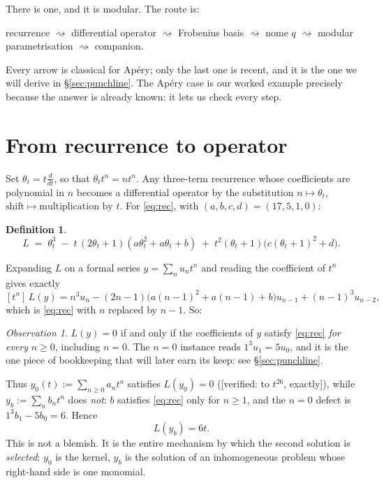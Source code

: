 \documentclass[11pt,reqno]{amsart}
\theoremstyle{plain}
\theoremstyle{definition}
\newtheorem{definition}[theorem]{Definition}
\theoremstyle{remark}
\newtheorem{observation}[theorem]{Observation}
\newcommand{\Ver}[1]{\textup{\textsf{[verified: #1]}}}
\newcommand{\ta}{\theta_t}
\numberwithin{equation}{section}
\begin{document}
There is one, and it is modular. The route is:
\begin{center}
recurrence $\rightsquigarrow$ differential operator $\rightsquigarrow$
Frobenius basis $\rightsquigarrow$ nome $q$ $\rightsquigarrow$ modular
parametrisation $\rightsquigarrow$ companion.
\end{center}
Every arrow is classical for Ap\'ery; only the last one is recent, and it is
the one we will derive in \S\ref{sec:punchline}. The Ap\'ery case is our worked
example precisely because the answer is already known: it lets us check every
step.

\section{From recurrence to operator}\label{sec:op}

Set $\ta=t\frac{d}{dt}$, so that $\ta t^n=nt^n$. Any three-term recurrence
whose coefficients are polynomial in $n$ becomes a differential operator by the
substitution $n\mapsto\ta$, $\text{shift}\mapsto\text{multiplication by }t$.
For \eqref{eq:rec}, with $(a,b,c,d)=(17,5,1,0)$:

\begin{definition}\label{def:L}
\[
  L \;=\; \ta^{3}\;-\;t\,(2\ta+1)(a\ta^{2}+a\ta+b)
        \;+\;t^{2}(\ta+1)\bigl(c(\ta+1)^{2}+d\bigr).
\]
\end{definition}

Expanding $L$ on a formal series $y=\sum_n u_nt^n$ and reading the coefficient
of $t^n$ gives exactly
\[
  [t^n]\,L(y)=n^3u_n-(2n-1)\bigl(a(n-1)^2+a(n-1)+b\bigr)u_{n-1}
              +(n-1)^3u_{n-2},
\]
which is \eqref{eq:rec} with $n$ replaced by $n-1$. So:

\begin{observation}\label{obs:dict}
$L(y)=0$ if and only if the coefficients of $y$ satisfy \eqref{eq:rec}
\emph{for every} $n\ge0$, including $n=0$. The $n=0$ instance reads
$1^3u_1=5u_0$, and it is the one piece of bookkeeping that will later earn its
keep: see \S\ref{sec:punchline}.
\end{observation}

Thus $y_0(t):=\sum_{n\ge0}a_nt^n$ satisfies $L(y_0)=0$
(\Ver{to $t^{26}$, exactly}), while $y_b:=\sum_n b_nt^n$ does \emph{not}:
$b$ satisfies \eqref{eq:rec} only for $n\ge1$, and the $n=0$ defect is
$1^3b_1-5b_0=6$. Hence
\begin{equation}\label{eq:inhom}
  L(y_b)=6t .
\end{equation}
This is not a blemish. It is the entire mechanism by which the second solution
is \emph{selected}: $y_0$ is the kernel, $y_b$ is the solution of an
inhomogeneous problem whose right-hand side is one monomial.
\end{document}
